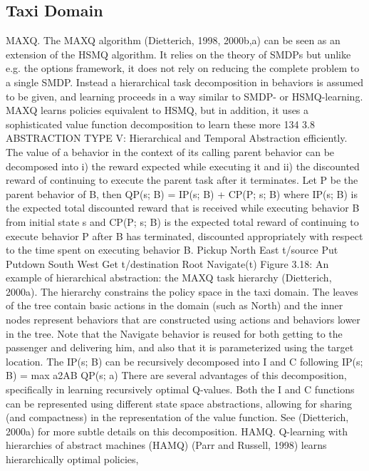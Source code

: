 \subsection{Taxi Domain}
MAXQ. The MAXQ algorithm (Dietterich, 1998, 2000b,a) can be seen as an extension
of the HSMQ algorithm. It relies on the theory of SMDPs but unlike e.g. the options
framework, it does not rely on reducing the complete problem to a single SMDP. Instead a
hierarchical task decomposition in behaviors is assumed to be given, and learning proceeds
in a way similar to SMDP- or HSMQ-learning. MAXQ learns policies equivalent to HSMQ,
but in addition, it uses a sophisticated value function decomposition to learn these more
134
3.8 ABSTRACTION TYPE V: Hierarchical and Temporal Abstraction
efficiently. The value of a behavior in the context of its calling parent behavior can be
decomposed into i) the reward expected while executing it and ii) the discounted reward
of continuing to execute the parent task after it terminates. Let P be the parent behavior
of B, then
QP(s; B) = IP(s; B) + CP(P; s; B)
where IP(s; B) is the expected total discounted reward that is received while executing
behavior B from initial state s and CP(P; s; B) is the expected total reward of continuing to
execute behavior P after B has terminated, discounted appropriately with respect to the
time spent on executing behavior B.
Pickup
North East
t/source
Put
Putdown
South West
Get
t/destination
Root
Navigate(t)
Figure 3.18: An example of hierarchical abstraction:
the MAXQ task hierarchy (Dietterich,
2000a). The hierarchy constrains the policy space
in the taxi domain. The leaves of the tree contain
basic actions in the domain (such as North) and
the inner nodes represent behaviors that are constructed
using actions and behaviors lower in the
tree. Note that the Navigate behavior is reused
for both getting to the passenger and delivering
him, and also that it is parameterized using the
target location.
The IP(s; B) can be recursively decomposed
into I and C following
IP(s; B) = max
a2AB
QP(s; a)
There are several advantages of this decomposition,
specifically in learning recursively
optimal Q-values. Both the I and C functions
can be represented using different state
space abstractions, allowing for sharing (and
compactness) in the representation of the
value function. See (Dietterich, 2000a) for
more subtle details on this decomposition.
HAMQ. Q-learning with hierarchies of abstract
machines (HAMQ) (Parr and Russell,
1998) learns hierarchically optimal policies,
